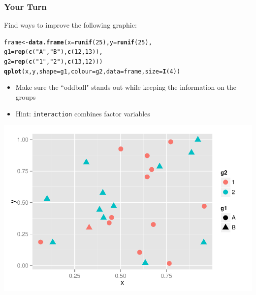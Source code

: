 \documentclass{beamer}\usepackage[]{graphicx}\usepackage[]{color}
\makeatletter
\newcommand{\hlnum}[1]{\textcolor[rgb]{0.686,0.059,0.569}{#1}}%
\newcommand{\hlstr}[1]{\textcolor[rgb]{0.192,0.494,0.8}{#1}}%
\newcommand{\hlstd}[1]{\textcolor[rgb]{0.345,0.345,0.345}{#1}}%
\newcommand{\hlkwb}[1]{\textcolor[rgb]{0.69,0.353,0.396}{#1}}%
\newcommand{\hlkwc}[1]{\textcolor[rgb]{0.333,0.667,0.333}{#1}}%
\newcommand{\hlkwd}[1]{\textcolor[rgb]{0.737,0.353,0.396}{\textbf{#1}}}%
\newenvironment{kframe}{%
 \def\at@end@of@kframe{}%
 \ifinner\ifhmode%
  \def\at@end@of@kframe{\end{minipage}}%
  \begin{minipage}{\columnwidth}%
 \fi\fi%
 \def\FrameCommand##1{\hskip\@totalleftmargin \hskip-\fboxsep
 \colorbox{shadecolor}{##1}\hskip-\fboxsep
     \hskip-\linewidth \hskip-\@totalleftmargin \hskip\columnwidth}%
 \MakeFramed {\advance\hsize-\width
   \@totalleftmargin\z@ \linewidth\hsize
   \@setminipage}}%
 {\par\unskip\endMakeFramed%
 \at@end@of@kframe}
\newenvironment{knitrout}{}{} %
\makeatother
\begin{document}
\begin{frame}[fragile]
\frametitle{Your Turn}
\vspace{-12pt}Find ways to improve the following graphic:
\begin{knitrout}\footnotesize
{}\color{fgcolor}\begin{kframe}
\begin{alltt}
\hlstd{frame} \hlkwb{<-} \hlkwd{data.frame}\hlstd{(}\hlkwc{x}\hlstd{=}\hlkwd{runif}\hlstd{(}\hlnum{25}\hlstd{),} \hlkwc{y}\hlstd{=}\hlkwd{runif}\hlstd{(}\hlnum{25}\hlstd{),}
        \hlkwc{g1}\hlstd{=}\hlkwd{rep}\hlstd{(}\hlkwd{c}\hlstd{(}\hlstr{"A"}\hlstd{,}\hlstr{"B"}\hlstd{),} \hlkwd{c}\hlstd{(}\hlnum{12}\hlstd{,}\hlnum{13}\hlstd{)),}
        \hlkwc{g2}\hlstd{=}\hlkwd{rep}\hlstd{(}\hlkwd{c}\hlstd{(}\hlstr{"1"}\hlstd{,} \hlstr{"2"}\hlstd{),} \hlkwd{c}\hlstd{(}\hlnum{13}\hlstd{,}\hlnum{12}\hlstd{)))}
\hlkwd{qplot}\hlstd{(x,y,} \hlkwc{shape}\hlstd{=g1,} \hlkwc{colour}\hlstd{=g2,} \hlkwc{data}\hlstd{=frame,} \hlkwc{size}\hlstd{=}\hlkwd{I}\hlstd{(}\hlnum{4}\hlstd{))}
\end{alltt}
\end{kframe}
\end{knitrout}
\vspace{-8pt}\begin{minipage}{.5\linewidth}
\begin{itemize}
\item Make sure the ``oddball" stands out while keeping the information on the groups
\item Hint: \texttt{interaction} combines factor variables
\end{itemize}
\end{minipage}
\begin{minipage}{.485\linewidth}\includegraphics[width=.95\linewidth,keepaspectratio=TRUE]{figure/yourturn1}\end{minipage}
\end{frame}
\end{document}
